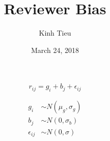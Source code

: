 \documentclass{article}
\begin{document}
\title{Reviewer Bias}
\author{Kinh Tieu}
\date{March 24, 2018}
\maketitle

\begin{equation}
r_{ij} = g_i + b_j + \epsilon_{ij}
\end{equation}

\begin{align}
g_i &\sim N(\mu_g,\sigma_g) \\
b_j &\sim N(0,\sigma_b) \\
\epsilon_{ij} &\sim N(0,\sigma)
\end{align}



\end{document}
